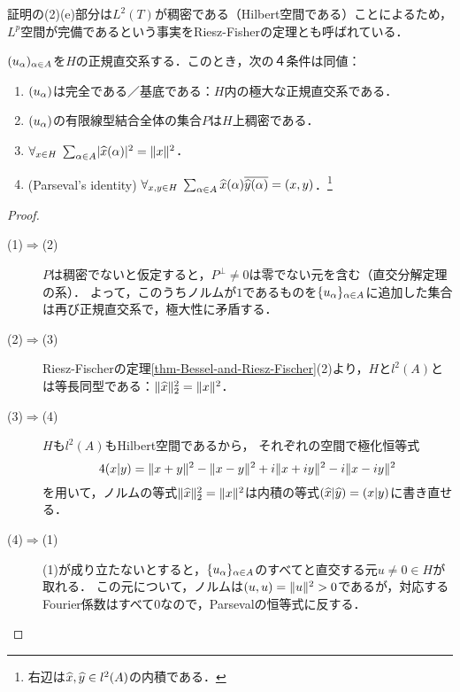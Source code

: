 \documentclass[uplatex,dvipdfmx]{jsreport}
\begin{document}
\begin{remark}
    証明の(2)(e)部分は$L^2(T)$が稠密である（Hilbert空間である）ことによるため，$L^p$空間が完備であるという事実をRiesz-Fisherの定理とも呼ばれている．
\end{remark}

\begin{theorem}\label{thm-Parseval}
    $(u_\alpha)_{\alpha\in A}$を$H$の正規直交系する．このとき，次の４条件は同値：
    \begin{enumerate}
        \item $(u_\alpha)$は完全である／基底である：$H$内の極大な正規直交系である．
        \item $(u_\alpha)$の有限線型結合全体の集合$P$は$H$上稠密である．
        \item $\forall_{x\in H}\;\sum_{\alpha\in A}\lvert\widehat{x}(\alpha)\rvert^2=\|x\|^2$．
        \item (Parseval's identity) $\forall_{x,y\in H}\;\sum_{\alpha\in A}\widehat{x}(\alpha)\overline{\widehat{y}(\alpha)}=(x,y)$．\footnote{右辺は$\widehat{x},\widehat{y}\in l^2(A)$の内積である．}
    \end{enumerate}
\end{theorem}
\begin{proof}\mbox{}
    \begin{description}
        \item[(1)$\Rightarrow$(2)] 
        $P$は稠密でないと仮定すると，$P^\perp\ne0$は零でない元を含む（直交分解定理の系）．
        よって，このうちノルムが$1$であるものを$\{u_\alpha\}_{\alpha\in A}$に追加した集合は再び正規直交系で，極大性に矛盾する．
        \item[(2)$\Rightarrow$(3)] 
        Riesz-Fischerの定理\ref{thm-Bessel-and-Riesz-Fischer}(2)より，$H$と$l^2(A)$とは等長同型である：$\|\widehat{x}\|^2_2=\|x\|^2$．
        \item[(3)$\Rightarrow$(4)] $H$も$l^2(A)$もHilbert空間であるから，
        それぞれの空間で極化恒等式
        \[4(x|y)=\|x+y\|^2-\|x-y\|^2+i\|x+iy\|^2-i\|x-iy\|^2\]
        を用いて，ノルムの等式$\|\widehat{x}\|^2_2=\|x\|^2$は内積の等式$(\widehat{x}|\widehat{y})=(x|y)$に書き直せる．
        \item[(4)$\Rightarrow$(1)]
        (1)が成り立たないとすると，$\{u_\alpha\}_{\alpha\in A}$のすべてと直交する元$u\ne0\in H$が取れる．
        この元について，ノルムは$(u,u)=\|u\|^2>0$であるが，対応するFourier係数はすべて$0$なので，Parsevalの恒等式に反する．
    \end{description}
\end{proof}
\end{document}
